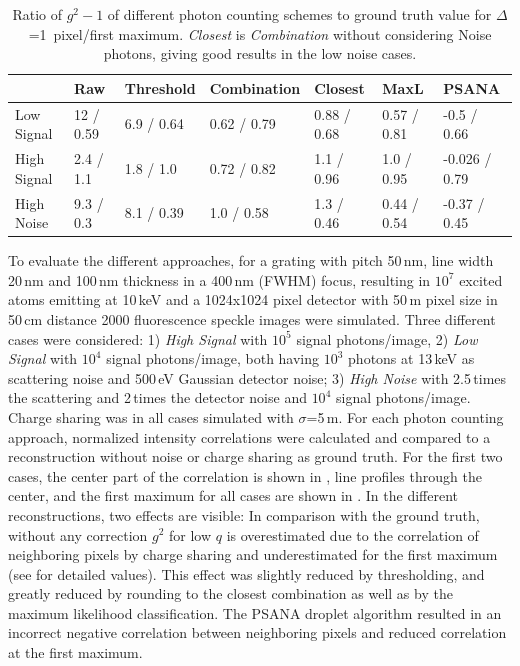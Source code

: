 \begin{table}
	\caption[Ratio of $g^2-1$ of different photon counting schemes to ground truth value]{Ratio of $g^2-1$ of different photon counting schemes to ground truth value  for $\Delta$=1\, pixel/first maximum. \textit{Closest} is \textit{Combination} without considering Noise photons, giving good results in the low noise cases.}
	\label{tab:photonrecon}
	
	\begin{adjustwidth}{-1em}{-2em}	
		\small
		\begin{tabular}{lllllll}
			\toprule
			&        Raw &       Threshold &         Combination &      Closest &         MaxL &          PSANA \\
			\midrule
			Low Signal  &  12 / 0.59 &  6.9 / 0.64 &  0.62 / 0.79 &  0.88 / 0.68 &  0.57 / 0.81 &    -0.5 / 0.66 \\
			High Signal &  2.4 / 1.1 &   1.8 / 1.0 &  0.72 / 0.82 &   1.1 / 0.96 &   1.0 / 0.95 &  -0.026 / 0.79 \\
			High Noise  &  9.3 / 0.3 &  8.1 / 0.39 &   1.0 / 0.58 &   1.3 / 0.46 &  0.44 / 0.54 &   -0.37 / 0.45 \\
			\bottomrule
		\end{tabular}
	\end{adjustwidth}
\end{table}

To evaluate the different approaches, for a grating with pitch 50\,nm, line width 20\,nm and 100\,nm thickness in a 400\,nm (FWHM) focus, resulting in $10^7$ excited atoms emitting at 10\,keV and a 1024x1024 pixel detector with 50\,\textmu m pixel size in 50\,cm distance 2000 fluorescence speckle images were simulated. Three different cases were considered: 1) \textit{High Signal}  with $10^5 $ signal photons/image, 2) \textit{Low Signal} with $10^4$ signal photons/image, both having $10^3$ photons at 13\,keV as scattering noise and 500\,eV Gaussian detector noise;  3)  \textit{High Noise} with 2.5\,times the scattering and 2\,times the detector noise  and $10^4$ signal photons/image. Charge sharing was in all cases simulated with $\sigma$=5\,\textmu m.  For each photon counting approach, normalized intensity correlations were calculated and compared to a reconstruction without noise or charge sharing as ground truth. For the first two cases, the center part of the correlation is shown in , line profiles through the center, and the first maximum for all cases are shown in . In the different reconstructions, two effects are visible: In comparison with the ground truth, without any correction $g^2$ for low $q$ is overestimated due to the correlation of neighboring pixels by charge sharing and underestimated for the first maximum (see  for detailed values). This effect was slightly reduced by thresholding, and greatly reduced by rounding to the closest combination as well as by the maximum likelihood classification. The PSANA droplet algorithm resulted in an incorrect negative correlation between neighboring pixels and reduced correlation at the first maximum.

